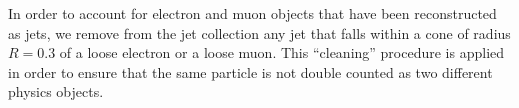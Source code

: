 \par
In order to account for electron and muon objects that
have been reconstructed as jets, we remove from the jet
collection any jet that falls within a
cone of radius $R= 0.3$ of a loose electron or a loose muon. 
This ``cleaning'' procedure is applied in order to ensure that the same
particle is not double counted as two different physics objects.
%
%
